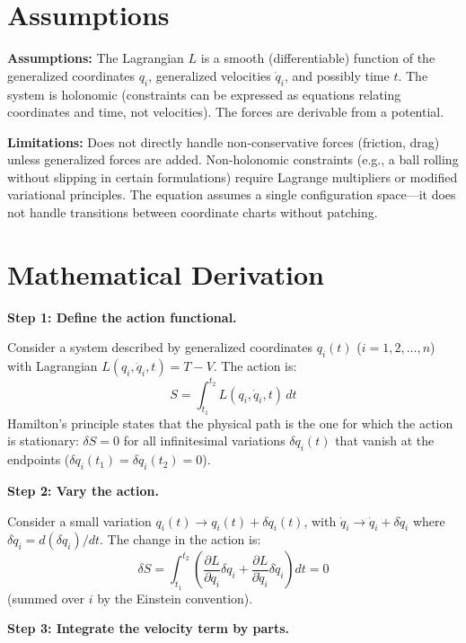 \documentclass[11pt,openright]{book}
\begin{document}
\section*{Assumptions}

\textbf{Assumptions:} The Lagrangian $L$ is a smooth (differentiable) function of the generalized coordinates $q_i$, generalized velocities $\dot{q}_i$, and possibly time $t$. The system is holonomic (constraints can be expressed as equations relating coordinates and time, not velocities). The forces are derivable from a potential.


\textbf{Limitations:} Does not directly handle non-conservative forces (friction, drag) unless generalized forces are added. Non-holonomic constraints (e.g., a ball rolling without slipping in certain formulations) require Lagrange multipliers or modified variational principles. The equation assumes a single configuration space---it does not handle transitions between coordinate charts without patching.


\section*{Mathematical Derivation}

\textbf{Step 1: Define the action functional.}

Consider a system described by generalized coordinates $q_i(t)$ ($i = 1, 2, \ldots, n$) with Lagrangian $L(q_i, \dot{q}_i, t) = T - V$. The action is:
\begin{equation}
S = \int_{t_1}^{t_2} L(q_i, \dot{q}_i, t)\, dt
\end{equation}
Hamilton's principle states that the physical path is the one for which the action is stationary: $\delta S = 0$ for all infinitesimal variations $\delta q_i(t)$ that vanish at the endpoints ($\delta q_i(t_1) = \delta q_i(t_2) = 0$).

\textbf{Step 2: Vary the action.}

Consider a small variation $q_i(t) \to q_i(t) + \delta q_i(t)$, with $\dot{q}_i \to \dot{q}_i + \delta\dot{q}_i$ where $\delta\dot{q}_i = d(\delta q_i)/dt$. The change in the action is:
\begin{equation}
\delta S = \int_{t_1}^{t_2}\left(\frac{\partial L}{\partial q_i}\delta q_i + \frac{\partial L}{\partial \dot{q}_i}\delta\dot{q}_i\right) dt = 0
\end{equation}
(summed over $i$ by the Einstein convention).

\textbf{Step 3: Integrate the velocity term by parts.}
\end{document}
